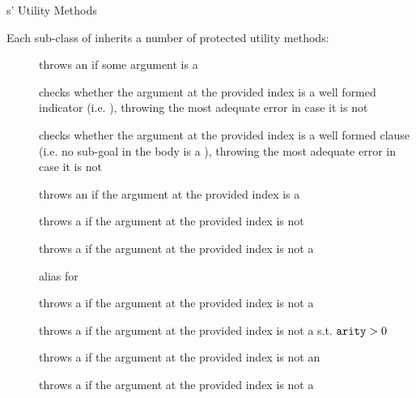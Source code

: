 \documentclass[handout]{beamer}
\begin{document}
\begin{frame}[allowframebreaks]{s' Utility Methods}\small

    Each sub-class of  inherits a number of protected utility methods:
    \begin{description}
        \item[] throws an  if some argument is a 
        \item[] checks whether the argument at the provided index is a well formed indicator (i.e. ), throwing the most adequate error in case it is not
        \item[] checks whether the argument at the provided index is a well formed clause (i.e. no sub-goal in the body is a ), throwing the most adequate error in case it is not
        \item[] throws an  if the argument at the provided index is a 
        \item[] throws a  if the argument at the provided index is not 
        \item[] throws a  if the argument at the provided index is not a 
        \item[] alias for 
        \item[] throws a  if the argument at the provided index is not a 
        \item[] throws a  if the argument at the provided index is not a  s.t. $\texttt{arity} > 0$
        \item[] throws a  if the argument at the provided index is not an 
        \item[] throws a  if the argument at the provided index is not a 

\end{description}
\end{frame}
\end{document}
